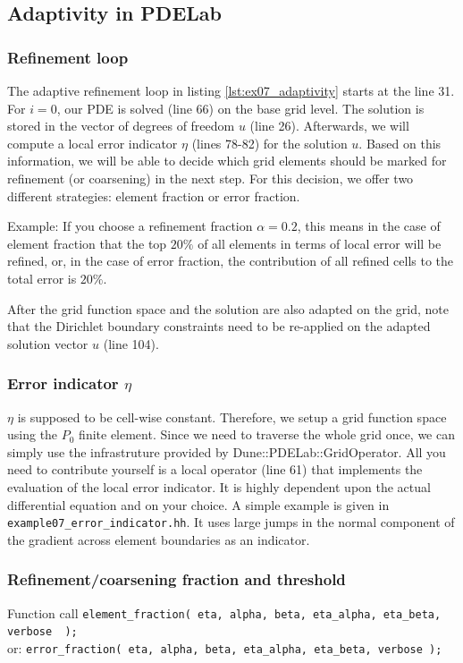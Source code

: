 \subsection{Adaptivity in PDELab}

\subsubsection*{Refinement loop}

The adaptive refinement loop in listing \ref{lst:ex07_adaptivity} starts at the line 31. For $i=0$, our
PDE is solved (line 66) on the base grid level. The solution is stored in the
vector of degrees of freedom $u$ (line 26). Afterwards, we will compute
a local error indicator $\eta$ (lines 78-82) for the solution $u$.
Based on this information, we will be able to decide which grid elements
should be marked for refinement (or coarsening) in the next step.
For this decision, we offer two different strategies: element fraction or error fraction.

Example: If you choose a refinement fraction $\alpha=0.2$, this means in the
case of element fraction that the top $20\%$ of all
elements in terms of local error will be refined, or, in the case of error
fraction, the contribution of all refined cells to the total error is $20\%$.

After the grid function space and the solution are also adapted on the grid,
note that the Dirichlet boundary constraints need to be
re-applied on the adapted solution vector $u$ (line 104).


\subsubsection*{Error indicator $\eta$}
$\eta$ is supposed to be cell-wise constant. Therefore, we setup a grid function space using the $P_0$
finite element. Since we need to traverse the whole grid once, we can
simply use the infra\/struture provided by Dune::PDELab::GridOperator.
All you need to contribute yourself is a local operator (line 61) that
implements the evaluation of the local error indicator.
It is highly dependent upon the actual differential equation and on your
choice. A simple example is given in \lstinline{example07_error_indicator.hh}.
It uses large jumps in the normal component of the gradient across element
boundaries as an indicator.



\subsubsection*{Refinement/coarsening fraction and threshold}
\begin{block}{Function call}
  \lstinline{element_fraction( eta, alpha, beta, eta_alpha, eta_beta, verbose  );}\\
  or: \lstinline{error_fraction( eta, alpha, beta, eta_alpha, eta_beta, verbose );}
\end{block}

